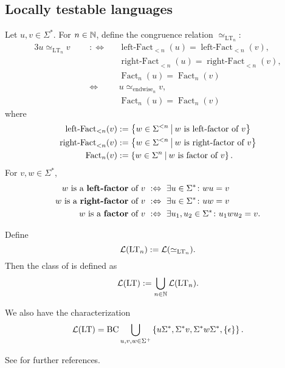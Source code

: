 \subsection{Locally testable languages}
\label{lang:LT}
Let $u,v \in \Sigma^*$. For $n \in \mathbb{N}$, define the congruence relation $\simeq_{\text{LT}_n}$:
\begin{alignat*}{3}
u \simeq_{\text{LT}_n} v \ \ \ && :\Leftrightarrow \ \ \ & \operatorname{left-Fact}_{<n}(u) = \operatorname{left-Fact}_{<n}(v) , \\
&&& \operatorname{right-Fact}_{<n}(u) = \operatorname{right-Fact}_{<n}(v) , \\
&&& \operatorname{Fact}_{n}(u) = \operatorname{Fact}_{n}(v) \\
&& \Leftrightarrow \ \ \ & u \simeq_{\text{endwise}_n} v , \\
&&& \operatorname{Fact}_n(u) = \operatorname{Fact}_n(v)
\end{alignat*}
where
\begin{align*}
\operatorname{left-Fact}_{<n}(v) & := \Set{w \in \Sigma^{<n}}{\text{$w$ is left-factor of $v$}} \\
\operatorname{right-Fact}_{<n}(v) & := \Set{w \in \Sigma^{<n}}{\text{$w$ is right-factor of $v$}} \\
\operatorname{Fact}_{n}(v) & := \Set{w \in \Sigma^{n}}{\text{$w$ is factor of $v$}}.
\end{align*}
For $v,w \in \Sigma^*$,
\begin{align*}
\text{$w$ is a \defword{left-factor} of $v$} & \ :\Leftrightarrow \ \exists u \in \Sigma^* \colon wu = v \\
\text{$w$ is a \defword{right-factor} of $v$} & \ :\Leftrightarrow \ \exists u \in \Sigma^* \colon uw = v \\
\text{$w$ is a \defword{factor} of $v$} & \ :\Leftrightarrow \ \exists u_1,u_2 \in \Sigma^* \colon u_1 w u_2 = v.
\end{align*}

Define
\[ \mathcal{L}(\textup{\textrm{LT}}_n) := \mathcal{L}(\simeq_{\text{LT}_n}) . \]
Then the class of  is defined as
\[ \mathcal{L}(\textup{\textrm{LT}}) := \bigcup_{n\in\mathbb{N}} \mathcal{L}(\textup{\textrm{LT}}_n) . \]

We also have the characterization
\[ \Lang(\LT) = \BC \bigcup_{u,v,w \in \Sigma^+} \Set{u\Sigma^*, \Sigma^* v, \Sigma^* w \Sigma^*, \Set{\epsilon}} . \]

See \cite[Section 2.5]{ConcHierR104} for further references.

